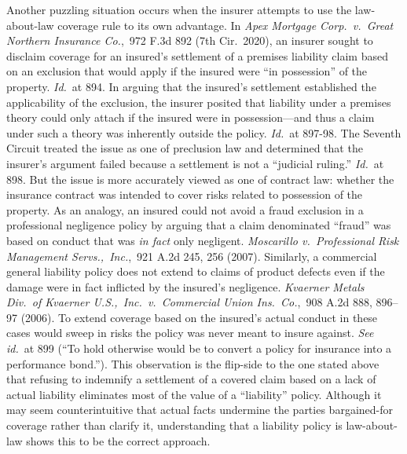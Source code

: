 \documentclass[
  12pt,
  letterpaper,
]{scrartcl}
\begin{document}
Another puzzling situation occurs when the insurer attempts to use the
law-about-law coverage rule to its own advantage. In \textit{Apex Mortgage
Corp.~v.~Great Northern Insurance Co.},~972 F.3d 892 (7th Cir.~2020), an
insurer sought to disclaim coverage for an insured's settlement of a premises
liability claim based on an exclusion that would apply if the insured were ``in
possession'' of the property. \textit{Id.}~at 894. In arguing that the
insured's settlement established the applicability of the exclusion, the
insurer posited that liability under a premises theory could only attach if the
insured were in possession---and thus a claim under such a theory was
inherently outside the policy. \textit{Id.}~at 897-98. The Seventh Circuit
treated the issue as one of preclusion law and determined that the insurer's
argument failed because a settlement is not a ``judicial ruling.''
\textit{Id.}~at 898. But the issue is more accurately viewed as one of contract
law: whether the insurance contract was intended to cover risks related to
possession of the property. As an analogy, an insured could not avoid a fraud
exclusion in a professional negligence policy by arguing that a claim
denominated ``fraud'' was based on conduct that was \textit{in fact} only
negligent. \textit{Moscarillo v.~Professional Risk Management
Servs.,~Inc.},~921 A.2d 245, 256 (2007). Similarly, a commercial general
liability policy does not extend to claims of product defects even if the
damage were in fact inflicted by the insured's negligence. \textit{Kvaerner
Metals Div.~of Kvaerner U.S.,~Inc.~v.~Commercial Union Ins.~Co.},~908 A.2d 888,
896--97 (2006). To extend coverage based on the insured's actual conduct in
these cases would sweep in risks the policy was never meant to insure against.
\textit{See} \textit{id.}~at 899 (``To hold otherwise would be to convert a
policy for insurance into a performance bond.''). This observation is the
flip-side to the one stated above that refusing to indemnify a settlement of a
covered claim based on a lack of actual liability eliminates most of the value
of a ``liability'' policy. Although it may seem counterintuitive that actual
facts undermine the parties bargained-for coverage rather than clarify it,
understanding that a liability policy is law-about-law shows this to be the
correct approach.
\end{document}
